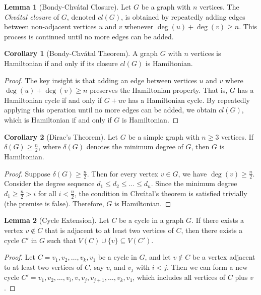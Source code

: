 \documentclass{article}
\theoremstyle{definition}
\newtheorem{lemma}{Lemma}
\newtheorem{corollary}{Corollary}
\begin{document}
\begin{lemma}[Bondy-Chvátal Closure]
Let $G$ be a graph with $n$ vertices. The \emph{Chvátal closure} of $G$, denoted $cl(G)$, is obtained by repeatedly adding edges between non-adjacent vertices $u$ and $v$ whenever $\deg(u) + \deg(v) \geq n$. This process is continued until no more edges can be added.
\end{lemma}

\begin{corollary}[Bondy-Chvátal Theorem]
A graph $G$ with $n$ vertices is Hamiltonian if and only if its closure $cl(G)$ is Hamiltonian.
\end{corollary}

\begin{proof}
The key insight is that adding an edge between vertices $u$ and $v$ where $\deg(u) + \deg(v) \geq n$ preserves the Hamiltonian property. That is, $G$ has a Hamiltonian cycle if and only if $G + uv$ has a Hamiltonian cycle. By repeatedly applying this operation until no more edges can be added, we obtain $cl(G)$, which is Hamiltonian if and only if $G$ is Hamiltonian.
\end{proof}

\begin{corollary}[Dirac's Theorem]
Let $G$ be a simple graph with $n \geq 3$ vertices. If $\delta(G) \geq \frac{n}{2}$, where $\delta(G)$ denotes the minimum degree of $G$, then $G$ is Hamiltonian.
\end{corollary}

\begin{proof}
Suppose $\delta(G) \geq \frac{n}{2}$. Then for every vertex $v \in G$, we have $\deg(v) \geq \frac{n}{2}$. Consider the degree sequence $d_1 \leq d_2 \leq \ldots \leq d_n$. Since the minimum degree $d_1 \geq \frac{n}{2} > i$ for all $i < \frac{n}{2}$, the condition in Chvátal's theorem is satisfied trivially (the premise is false). Therefore, $G$ is Hamiltonian.
\end{proof}

\begin{lemma}[Cycle Extension]
Let $C$ be a cycle in a graph $G$. If there exists a vertex $v \not\in C$ that is adjacent to at least two vertices of $C$, then there exists a cycle $C'$ in $G$ such that $V(C) \cup \{v\} \subseteq V(C')$.
\end{lemma}

\begin{proof}
Let $C = v_1, v_2, \ldots, v_k, v_1$ be a cycle in $G$, and let $v \not\in C$ be a vertex adjacent to at least two vertices of $C$, say $v_i$ and $v_j$ with $i < j$. Then we can form a new cycle $C' = v_1, v_2, \ldots, v_i, v, v_j, v_{j+1}, \ldots, v_k, v_1$, which includes all vertices of $C$ plus $v$.
\end{proof}
\end{document}
